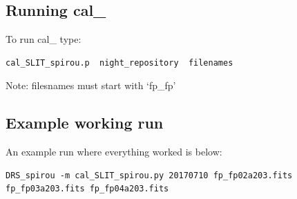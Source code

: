 \subsection{Running cal\_}
To run cal\_ type:
\begin{lstlisting}[language=bash, style=bashstyle]
cal_SLIT_spirou.p  night_repository  filenames
\end{lstlisting}

\noindent Note: filesnames must start with `fp\_fp'

\subsection{Example working run}

An example run where everything worked is below:

\begin{lstlisting}[style=text]
DRS_spirou -m cal_SLIT_spirou.py 20170710 fp_fp02a203.fits fp_fp03a203.fits fp_fp04a203.fits


\end{lstlisting}
